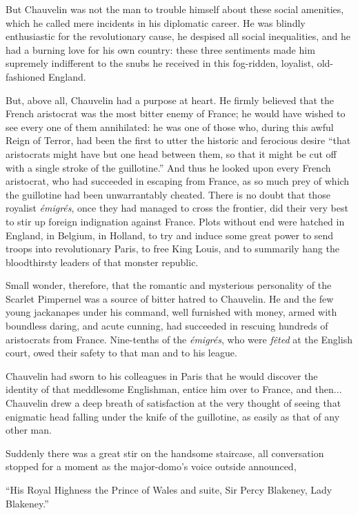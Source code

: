 But Chauvelin was not the man to trouble himself about these social amenities, which he called mere incidents in his diplomatic career. He was blindly enthusiastic for the revolutionary cause, he despised all social inequalities, and he had a burning love for his own country: these three sentiments made him supremely indifferent to the snubs he received in this fog-ridden, loyalist, old-fashioned England.

But, above all, Chauvelin had a purpose at heart. He firmly believed that the French aristocrat was the most bitter enemy of France; he would have wished to see every one of them annihilated: he was one of those who, during this awful Reign of Terror, had been the first to utter the historic and ferocious desire \enquote{that aristocrats might have but one head between them, so that it might be cut off with a single stroke of the guillotine.} And thus he looked upon every French aristocrat, who had succeeded in escaping from France, as so much prey of which the guillotine had been unwarrantably cheated. There is no doubt that those royalist \textit{émigrés}, once they had managed to cross the frontier, did their very best to stir up foreign indignation against France. Plots without end were hatched in England, in Belgium, in Holland, to try and induce some great power to send troops into revolutionary Paris, to free King Louis, and to summarily hang the bloodthirsty leaders of that monster republic.

Small wonder, therefore, that the romantic and mysterious personality of the Scarlet Pimpernel was a source of bitter hatred to Chauvelin. He and the few young jackanapes under his command, well furnished with money, armed with boundless daring, and acute cunning, had succeeded in rescuing hundreds of aristocrats from France. Nine-tenths of the \textit{émigrés}, who were \textit{fêted} at the English court, owed their safety to that man and to his league.

Chauvelin had sworn to his colleagues in Paris that he would discover the identity of that meddlesome Englishman, entice him over to France, and then... Chauvelin drew a deep breath of satisfaction at the very thought of seeing that enigmatic head falling under the knife of the guillotine, as easily as that of any other man.

Suddenly there was a great stir on the handsome staircase, all conversation stopped for a moment as the major-domo's voice outside announced,\longdash


\enquote{His Royal Highness the Prince of Wales and suite, Sir Percy Blakeney, Lady Blakeney.}


